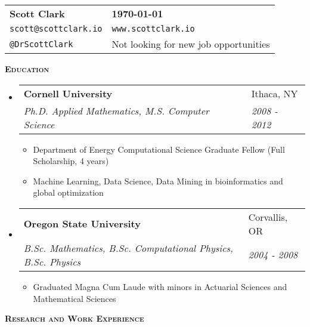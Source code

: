 \documentclass[letterpaper, 11pt]{article}
\makeatletter
\renewcommand{\section}[1]{%
  \begin{tcolorbox}
    \textsc{\textbf{\large{#1}}}
  \end{tcolorbox}
}
\newcommand{\entry}[4]{%
  \begin{tabularx}{\linewidth}{@{}Xl@{}}
    \textbf{#1} & #2          \\
    \textit{#3} & \textit{#4} \\
  \end{tabularx}
}
\makeatother
\begin{document}
  \begin{tabularx}{\linewidth}{@{}Xl@{}}
    \textbf{\Large{Scott Clark}} & \textbf{\today}                       \\
    \texttt{scott@scottclark.io} & \texttt{www.scottclark.io}            \\
    \texttt{@DrScottClark}       & Not looking for new job opportunities \\
  \end{tabularx}


\section{Education}


\begin{itemize}

\item
	\entry{Cornell University}{Ithaca, NY}{Ph.D. Applied Mathematics, M.S. Computer Science}{2008 - 2012}
	\begin{itemize}
		\item{Department of Energy Computational Science Graduate Fellow (Full Scholarship, 4 years)}
		\item{Machine Learning, Data Science, Data Mining in bioinformatics and global optimization}
	\end{itemize}

\item
	\entry{Oregon State University}{Corvallis, OR}{B.Sc. Mathematics, B.Sc. Computational Physics, B.Sc. Physics}{2004 - 2008}
	\begin{itemize}
		\item{Graduated Magna Cum Laude with minors in Actuarial Sciences and Mathematical Sciences}
	\end{itemize}

\end{itemize}


\section{Research and Work Experience}

\end{document}
